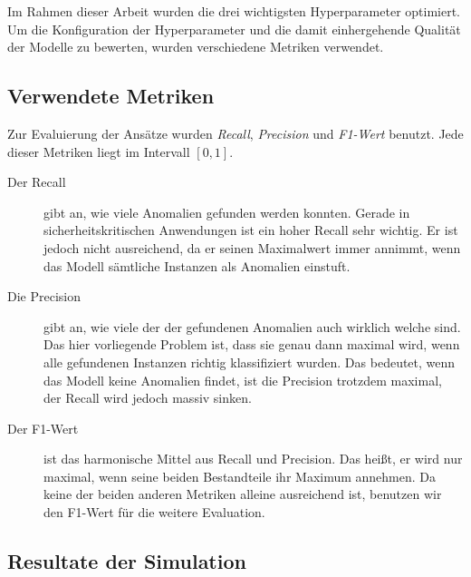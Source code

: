 \noindent Im Rahmen dieser Arbeit wurden die drei wichtigsten Hyperparameter optimiert.
Um die Konfiguration der Hyperparameter und die damit einhergehende Qualität der Modelle zu
bewerten, wurden verschiedene Metriken verwendet. 

\subsection{Verwendete Metriken}
\label{subsec:metriken}
Zur Evaluierung der Ansätze wurden \emph{Recall}, \emph{Precision} und \emph{F1-Wert} benutzt.
Jede dieser Metriken liegt im Intervall $[0,1]$.\cite{tharwat2020classification}

\begin{description}
    \item[Der Recall] gibt an, wie viele Anomalien gefunden werden
        konnten. Gerade in sicherheitskritischen Anwendungen ist ein hoher Recall sehr wichtig.
        Er ist jedoch nicht ausreichend, da er seinen Maximalwert immer annimmt, wenn das
        Modell sämtliche Instanzen als Anomalien einstuft.

    \item[Die Precision] gibt an, wie viele der 
        der gefundenen Anomalien auch wirklich welche sind. Das hier vorliegende Problem ist,
        dass sie genau dann maximal wird, wenn alle gefundenen Instanzen
        richtig klassifiziert wurden. Das bedeutet, wenn das Modell keine Anomalien
        findet, ist die Precision trotzdem maximal, der Recall wird jedoch massiv sinken.

    \item[Der F1-Wert] ist das harmonische Mittel aus Recall und Precision.
        Das heißt, er wird nur maximal, wenn seine beiden Bestandteile ihr Maximum annehmen.
        Da keine der beiden anderen Metriken alleine ausreichend ist, benutzen wir den F1-Wert
        für die weitere Evaluation.
\end{description}
 

\subsection{Resultate der Simulation}
\label{subsec:simulation}

